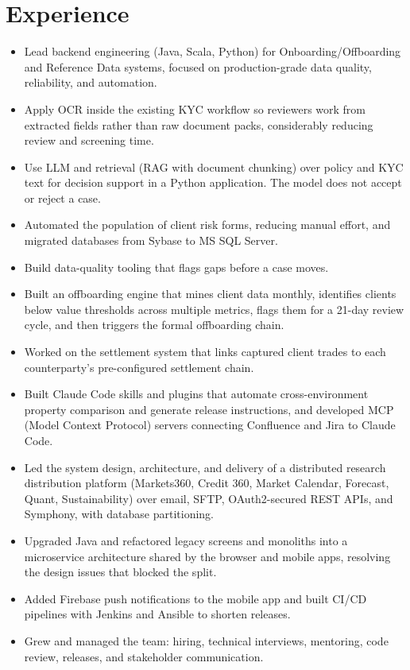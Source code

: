 \documentclass[10pt,a4paper]{article}
\newcommand{\role}[1]{\par\vspace{2.6pt}{\bfseries #1}\par}
\begin{document}
\section*{Experience}
\role{Nomura | Principal Engineer | Mumbai | Oct 2024 -- Present}
\begin{itemize}
  \item Lead backend engineering (Java, Scala, Python) for Onboarding/Offboarding and Reference Data systems, focused on production-grade data quality, reliability, and automation.
  \item Apply OCR inside the existing KYC workflow so reviewers work from extracted fields rather than raw document packs, considerably reducing review and screening time.
  \item Use LLM and retrieval (RAG with document chunking) over policy and KYC text for decision support in a Python application. The model does not accept or reject a case.
  \item Automated the population of client risk forms, reducing manual effort, and migrated databases from Sybase to MS SQL Server.
  \item Build data-quality tooling that flags gaps before a case moves.
  \item Built an offboarding engine that mines client data monthly, identifies clients below value thresholds across multiple metrics, flags them for a 21-day review cycle, and then triggers the formal offboarding chain.
  \item Worked on the settlement system that links captured client trades to each counterparty's pre-configured settlement chain.
  \item Built Claude Code skills and plugins that automate cross-environment property comparison and generate release instructions, and developed MCP (Model Context Protocol) servers connecting Confluence and Jira to Claude Code.
\end{itemize}
\role{BNP Paribas | Project Manager and Technical Lead | Mumbai | May 2022 -- Oct 2024}
\begin{itemize}
  \item Led the system design, architecture, and delivery of a distributed research distribution platform (Markets360, Credit 360, Market Calendar, Forecast, Quant, Sustainability) over email, SFTP, OAuth2-secured REST APIs, and Symphony, with database partitioning.
  \item Upgraded Java and refactored legacy screens and monoliths into a microservice architecture shared by the browser and mobile apps, resolving the design issues that blocked the split.
  \item Added Firebase push notifications to the mobile app and built CI/CD pipelines with Jenkins and Ansible to shorten releases.
  \item Grew and managed the team: hiring, technical interviews, mentoring, code review, releases, and stakeholder communication.
\end{itemize}
\end{document}
